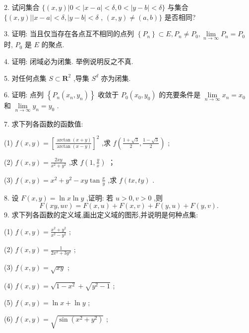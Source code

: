 2. 试问集合 \(\{ \left( {x,y}\right) \left| {0 < }\right| x - a\left| { < \delta ,0 < }\right| y - b \mid   < \delta \}\) 与集合 \(\{ \left( {x,y}\right) \left| \right| x - a\left| { < \delta ,}\right| y - b \mid   < \delta\) , \(\left( {x,y}\right)  \neq  \left( {a,b}\right) \}\) 是否相同?

3. 证明: 当且仅当存在各点互不相同的点列 \(\left\{  {P}_{n}\right\}   \subset  E,{P}_{n} \neq  {P}_{0},\mathop{\lim }\limits_{{n \rightarrow  \infty }}{P}_{n} = {P}_{0}\) 时, \({P}_{0}\) 是 \(E\) 的聚点.

4. 证明: 闭域必为闭集. 举例说明反之不真.

5. 对任何点集 \(S \subset  {\mathbf{R}}^{2}\) ,导集 \({S}^{d}\) 亦为闭集.

6. 证明: 点列 \(\left\{  {{P}_{n}\left( {{x}_{n},{y}_{n}}\right) }\right\}\) 收敛于 \({P}_{0}\left( {{x}_{0},{y}_{0}}\right)\) 的充要条件是 \(\mathop{\lim }\limits_{{n \rightarrow  \infty }}{x}_{n} = {x}_{0}\) 和 \(\mathop{\lim }\limits_{{n \rightarrow  \infty }}{y}_{n} = {y}_{0}\) .

7. 求下列各函数的函数值:

(1) \(f\left( {x,y}\right)  = {\left\lbrack  \frac{\arctan \left( {x + y}\right) }{\arctan \left( {x - y}\right) }\right\rbrack  }^{2}\) ,求 \(f\left( {\frac{1 + \sqrt{3}}{2},\frac{1 - \sqrt{3}}{2}}\right)\) ;

(2) \(f\left( {x,y}\right)  = \frac{2xy}{{x}^{2} + {y}^{2}}\) ,求 \(f\left( {1,\frac{y}{x}}\right)\) ；

(3) \(f\left( {x,y}\right)  = {x}^{2} + {y}^{2} - {xy}\tan \frac{x}{y}\) ,求 \(f\left( {{tx},{ty}}\right)\) .

8. 设 \(F\left( {x,y}\right)  = \ln x\ln y\) ,证明: 若 \(u > 0,v > 0\) ,则
\[
F\left( {{xy},{uv}}\right)  = F\left( {x,u}\right)  + F\left( {x,v}\right)  + F\left( {y,u}\right)  + F\left( {y,v}\right) .
\]
9. 求下列各函数的定义域,画出定义域的图形,并说明是何种点集:

(1) \(f\left( {x,y}\right)  = \frac{{x}^{2} + {y}^{2}}{{x}^{2} - {y}^{2}}\) ;

(2) \(f\left( {x,y}\right)  = \frac{1}{2{x}^{2} + 3{y}^{2}}\) ;

(3) \(f\left( {x,y}\right)  = \sqrt{xy}\) ;

(4) \(f\left( {x,y}\right)  = \sqrt{1 - {x}^{2}} + \sqrt{{y}^{2} - 1}\) ;

(5) \(f\left( {x,y}\right)  = \ln x + \ln y\) ;

(6) \(f\left( {x,y}\right)  = \sqrt{\sin \left( {{x}^{2} + {y}^{2}}\right) }\) ;

